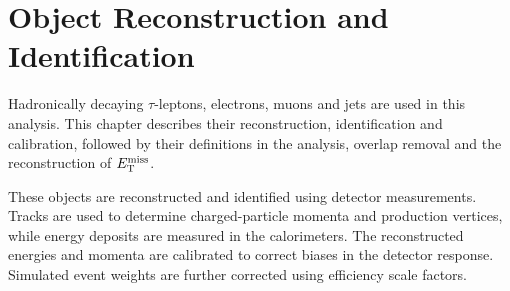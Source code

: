 \chapter{Object Reconstruction and Identification}
\label{chapter:object_reconstruction}

Hadronically decaying $\tau$-leptons, electrons, muons and jets are used in this analysis.
This chapter describes their reconstruction, identification and calibration, followed by their definitions in the analysis, overlap removal and the reconstruction of $E_{\mathrm{T}}^{\mathrm{miss}}$.

These objects are reconstructed and identified using detector measurements.
Tracks are used to determine charged-particle momenta and production vertices, while energy deposits are measured in the calorimeters.
The reconstructed energies and momenta are calibrated to correct biases in the detector response.
Simulated event weights are further corrected using efficiency scale factors.









% 


